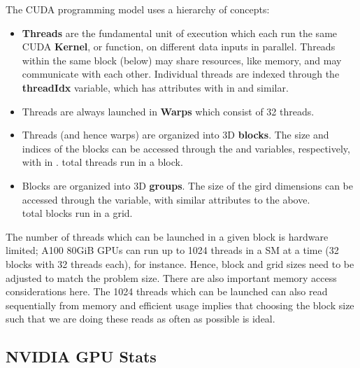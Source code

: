 \documentclass[11pt]{article}
\begin{document}
The CUDA programming model uses a hierarchy of concepts:
\begin{itemize}
	\item \textbf{Threads}  are the fundamental unit of execution which each run the same CUDA
	      \textbf{Kernel}, or function, on different data inputs in parallel. Threads within the same
	      block (below) may share resources, like memory, and may communicate with each other.
	      Individual threads are indexed
	      through the \textbf{threadIdx} variable, which has
	       attributes with  in 
	      and similar.
	\item Threads are always launched in \textbf{Warps} which consist of 32 threads.
	\item Threads (and hence warps) are organized into 3D \textbf{blocks}. The size and indices of
	      the blocks can be accessed through the  and 
	      variables, respectively, with  in .
	       total threads run in a block.
	\item Blocks are organized into 3D \textbf{groups}. The size of the gird dimensions can be
	      accessed through the  variable, with similar attributes to the above. \\
	       total blocks run in a grid.
\end{itemize}

The number of threads which can be launched in a given block is hardware limited; A100 80GiB GPUs
can run up to 1024 threads in a SM at a time (32 blocks with 32 threads each), for instance. Hence,
block and grid sizes need to be adjusted to match the problem size. There are also important memory
access considerations here. The 1024 threads which can be launched can also read sequentially from
memory and efficient usage implies that choosing the block size such that we are doing these reads
as often as possible is ideal.

\subsection{NVIDIA GPU Stats \label{app_gpu_stats}}
\end{document}
